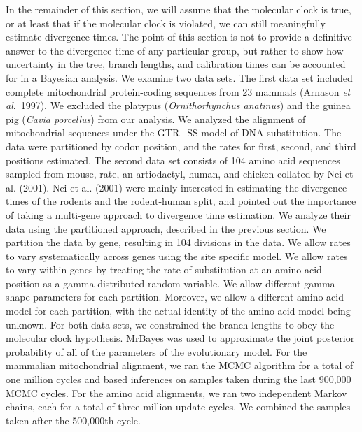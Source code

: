 \documentclass{svmult}
\begin{document}
In the remainder of this section, we will assume that the molecular clock is true, or at least that
if the molecular clock is violated, we can still meaningfully estimate divergence times. The point
of this section is not to provide a definitive answer to the divergence time of any particular
group, but rather to show how uncertainty in the tree, branch lengths, and calibration times can be
accounted for in a Bayesian analysis. We examine two data sets. The first data set included
complete mitochondrial protein-coding sequences from 23 mammals ({\sc Arnason} {\it et al}.\ 1997).
We excluded the platypus ({\it Ornithorhynchus anatinus}) and the guinea pig ({\it Cavia
porcellus}) from our analysis. We analyzed the alignment of mitochondrial sequences under the
GTR+SS model of DNA substitution. The data were partitioned by codon position, and the rates for
first, second, and third positions estimated. The second data set consists of 104 amino acid
sequences sampled from mouse, rate, an artiodactyl, human, and chicken collated by Nei et al.
(2001). Nei et al. (2001) were mainly interested in estimating the divergence times of the rodents
and the rodent-human split, and pointed out the importance of taking a multi-gene approach to
divergence time estimation. We analyze their data using the partitioned approach, described in the
previous section. We partition the data by gene, resulting in 104 divisions in the data. We allow
rates to vary systematically across genes using the site specific model. We allow rates to vary
within genes by treating the rate of substitution at an amino acid position as a gamma-distributed
random variable. We allow different gamma shape parameters for each partition. Moreover, we allow a
different amino acid model for each partition, with the actual identity of the amino acid model
being unknown.  For both data sets, we constrained the branch lengths to obey the molecular clock
hypothesis. MrBayes was used to approximate the joint posterior probability of all of the
parameters of the evolutionary model. For the mammalian mitochondrial alignment, we ran the MCMC
algorithm for a total of one million cycles and based inferences on samples taken during the last
900,000 MCMC cycles. For the amino acid alignments, we ran two independent Markov chains, each for
a total of three million update cycles. We combined the samples taken after the 500,000th cycle.
\end{document}
